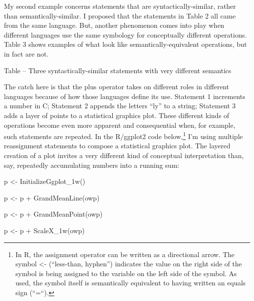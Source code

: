 My second example concerns statements that are syntactically-similar,
rather than semantically-similar. I proposed that the statements in
Table 2 all came from the same language. But, another phenomenon comes
into play when different languages use the same symbology for
conceptually different operations. Table 3 shows examples of what look
like semantically-equivalent operations, but in fact are not.

\protect\hypertarget{ux5fToc252445957}{}{}Table -- Three
syntactically-similar statements with very different semantics


The catch here is that the plus operator takes on different roles in
different languages because of how those languages define its use.
Statement 1 increments a number in C; Statement 2 appends the letters
``ly'' to a string; Statement 3 adds a layer of points to a statistical
graphics plot. These different kinds of operations become even more
apparent and consequential when, for example, such statements are
repeated. In the R/ggplot2 code below,\footnote{In R, the assignment
  operator can be written as a directional arrow. The symbol
  \textless{}- (``less-than, hyphen'') indicates the value on the right
  side of the symbol is being assigned to the variable on the left side
  of the symbol. As used, the symbol itself is semantically equivalent
  to having written an equals sign (``=``).} I'm using multiple
reassignment statements to compose a statistical graphics plot. The
layered creation of a plot invites a very different kind of conceptual
interpretation than, say, repeatedly accumulating numbers into a running
sum:

p \textless{}- InitializeGgplot\_1w()

p \textless{}- p + GrandMeanLine(owp)

p \textless{}- p + GrandMeanPoint(owp)

p \textless{}- p + ScaleX\_1w(owp)

